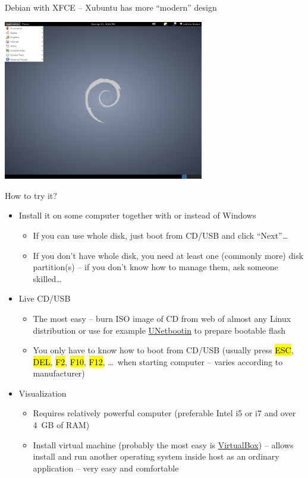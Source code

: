 \documentclass[compress, ucs, xelatex, 11pt, xcolor=svgnames,
  hyperref={
    bookmarks=true,
    unicode=true,
    colorlinks=true,
    pdftitle={Linux, command line and MetaCentrum},
    plainpages=false,
    pdfauthor={Vojtech Zeisek},
    pdfsubject={Course about use of Linux command line, writing shell scripts and using MetaCentrum of CESNET},
    pdfcreator={XeLaTeX},
    pdfkeywords={Linux, GNU, BASH, shell, command line, MetaCentrum},
    linkcolor=Red,
    anchorcolor=Blue,
    citecolor=Purple,
    filecolor=DodgerBlue,
    menucolor=DarkOrchid,
    urlcolor=DeepSkyBlue,
    pdftex},
  url={hyphens, lowtilde} %
  ]{beamer}
\renewcommand{\texttt}[1]{\hl{\ttfamily #1}}
\begin{document}
\begin{frame}{Debian with XFCE -- Xubuntu has more ``modern'' design}
\begin{center}
  \includegraphics[height=7cm]{debian.png}
\end{center}
\end{frame}

\begin{frame}{How to try it?}
\begin{itemize}
  \item Install it on some computer together with or instead of Windows
  \begin{itemize}
    \item If you can use whole disk, just boot from CD/USB and click ``Next''\ldots
    \item If you don't have whole disk, you need at least one (commonly more) disk partition(s) -- if you don't know how to manage them, ask someone skilled\ldots
  \end{itemize}
  \item Live CD/USB
  \begin{itemize}
    \item The most easy -- burn ISO image of CD from web of almost any Linux distribution or use for example \href{https://unetbootin.github.io/}{UNetbootin} to prepare bootable flash
    \item You only have to know how to boot from CD/USB (usually press \texttt{ESC}, \texttt{DEL}, \texttt{F2}, \texttt{F10}, \texttt{F12}, \ldots~when starting computer -- varies according to manufacturer)
  \end{itemize}
  \item Visualization
  \begin{itemize}
    \item Requires relatively powerful computer (preferable Intel i5 or i7 and over 4~GB of RAM)
    \item Install virtual machine (probably the most easy is \href{https://www.virtualbox.org/}{VirtualBox}) -- allows install and run another operating system inside host as an ordinary application -- very easy and comfortable
  \end{itemize}
\end{itemize}
\end{frame}
\end{document}
